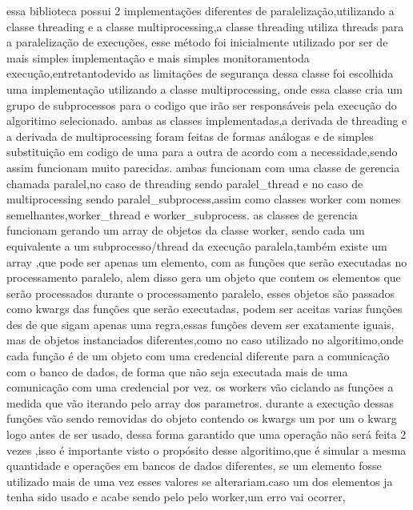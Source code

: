 \documentclass[
	12pt,				%
	openright,			%
	oneside,			%
	a4paper,			%
	english,			%
	french,				%
	spanish,			%
	brazil,				%
	]{abntex2}
\begin{document}
essa biblioteca possui 2 implementações diferentes de paralelização,utilizando a classe threading e a classe multiprocessing,a classe threading utiliza threads para a paralelização de execuções,
esse método foi inicialmente utilizado por ser de mais simples implementação e mais simples monitoramentoda execução,entretantodevido as limitações de segurança dessa classe foi escolhida uma implementação utilizando a classe multiprocessing,
onde essa classe cria um grupo de subprocessos para o codigo que irão ser responsáveis pela execução do algoritimo selecionado.
ambas as classes implementadas,a derivada de threading e a derivada de multiprocessing foram feitas de formas análogas e de simples substituição em codigo de uma para a outra de acordo com a necessidade,sendo assim funcionam muito parecidas.
ambas funcionam com uma classe de gerencia chamada paralel,no caso de threading sendo paralel_thread e no caso de multiprocessing sendo paralel_subprocess,assim como classes worker com nomes semelhantes,worker_thread e worker_subprocess.
as classes de gerencia funcionam gerando um array de objetos da classe worker,
sendo cada um equivalente a um subprocesso/thread da execução paralela,também existe um array ,que pode ser apenas um elemento,
com as funções que serão executadas no processamento paralelo,
alem disso gera um objeto que contem os elementos que serão processados durante o processamento paralelo,
esses objetos são passados como kwargs das funções que serão executadas,
podem ser aceitas varias funções des de que sigam apenas uma regra,essas funções devem ser exatamente iguais,
mas de objetos instanciados diferentes,como no caso utilizado no algoritimo,onde cada função é de um objeto com uma credencial diferente para a comunicação com o banco de dados,
de forma que não seja executada mais de uma comunicação com uma credencial por vez.
os workers vão ciclando as funções a medida que vão iterando pelo array dos parametros.
durante a execução dessas funções vão sendo removidas do objeto contendo os kwargs um por um o kwarg logo antes de ser usado,
dessa forma garantido que uma operação não será feita 2 vezes ,isso é importante visto o propósito desse algoritimo,que é simular a mesma quantidade e operações em bancos de dados diferentes,
se um elemento fosse utilizado mais de uma vez esses valores se alterariam.caso um dos elementos ja tenha sido usado e acabe sendo pelo pelo worker,um erro vai ocorrer,
\end{document}
